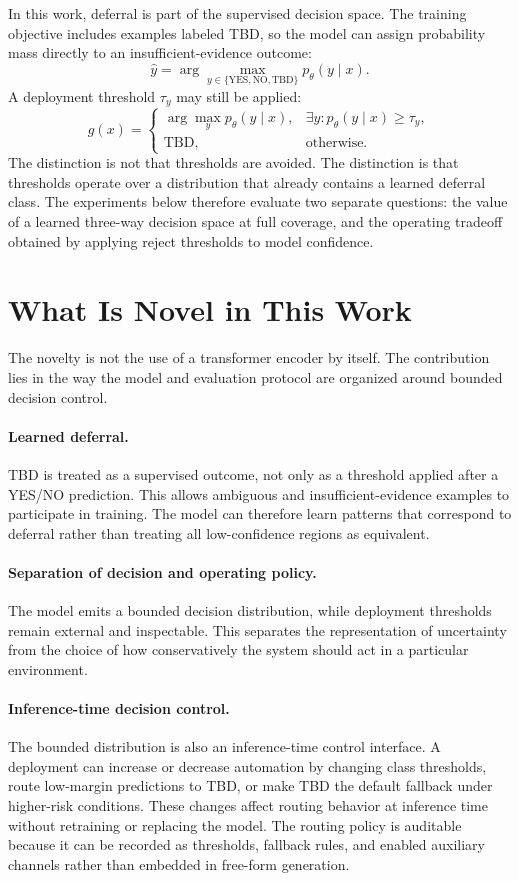 \documentclass[11pt]{article}
\begin{document}
In this work, deferral is part of the supervised decision space. The training objective includes examples labeled TBD, so the model can assign probability mass directly to an insufficient-evidence outcome:
\[
\hat{y} = \arg\max_{y \in \{\text{YES},\text{NO},\text{TBD}\}} p_\theta(y \mid x).
\]
A deployment threshold $\tau_y$ may still be applied:
\[
g(x) =
\begin{cases}
\arg\max_y p_\theta(y \mid x), & \exists y: p_\theta(y \mid x) \ge \tau_y,\\
\text{TBD}, & \text{otherwise.}
\end{cases}
\]
The distinction is not that thresholds are avoided. The distinction is that thresholds operate over a distribution that already contains a learned deferral class. The experiments below therefore evaluate two separate questions: the value of a learned three-way decision space at full coverage, and the operating tradeoff obtained by applying reject thresholds to model confidence.

\section{What Is Novel in This Work}

The novelty is not the use of a transformer encoder by itself. The contribution lies in the way the model and evaluation protocol are organized around bounded decision control.

\paragraph{Learned deferral.}
TBD is treated as a supervised outcome, not only as a threshold applied after a YES/NO prediction. This allows ambiguous and insufficient-evidence examples to participate in training. The model can therefore learn patterns that correspond to deferral rather than treating all low-confidence regions as equivalent.

\paragraph{Separation of decision and operating policy.}
The model emits a bounded decision distribution, while deployment thresholds remain external and inspectable. This separates the representation of uncertainty from the choice of how conservatively the system should act in a particular environment.

\paragraph{Inference-time decision control.}
The bounded distribution is also an inference-time control interface. A deployment can increase or decrease automation by changing class thresholds, route low-margin predictions to TBD, or make TBD the default fallback under higher-risk conditions. These changes affect routing behavior at inference time without retraining or replacing the model. The routing policy is auditable because it can be recorded as thresholds, fallback rules, and enabled auxiliary channels rather than embedded in free-form generation.
\end{document}
